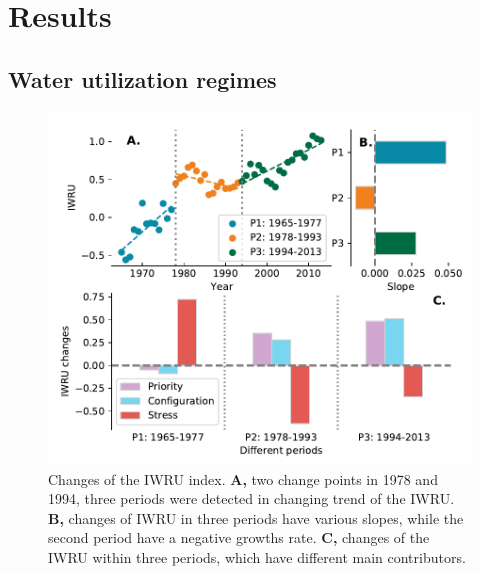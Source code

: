\documentclass[9pt, twocolumn, twoside, lineno]{pnas-new}
\begin{document}
\section*{Results}
\subsection*{Water utilization regimes}

\begin{figure}[ht!]
	\centering
	\includegraphics[width=\linewidth]{../../figures/main/index.pdf}
	\caption{Changes of the IWRU index. 
	\textbf{A,} two change points in 1978 and 1994, three periods were detected in changing trend of the IWRU.
	\textbf{B,} changes of IWRU in three periods have various slopes, while the second period have a negative growths rate.
	\textbf{C,} changes of the IWRU within three periods, which have different main contributors.
	}
	\label{fig:IWRU}
\end{figure}
\end{document}

